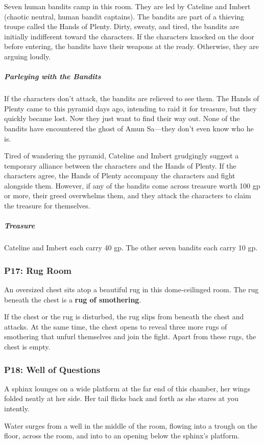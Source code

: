 \documentclass[10pt,a4paper,twoside,bg=print,twocolumn,openany,nodeprecatedcode]{dndbook}
\begin{document}
Seven human bandits camp in this room. They are led by Cateline and Imbert (chaotic neutral, human bandit captains). The bandits are part of a thieving troupe called the Hands of Plenty. Dirty, sweaty, and tired, the bandits are initially indifferent toward the characters. If the characters knocked on the door before entering, the bandits have their weapons at the ready. Otherwise, they are arguing loudly.

\subparagraph{Parleying with the Bandits}
If the characters don't attack, the bandits are relieved to see them. The Hands of Plenty came to this pyramid days ago, intending to raid it for treasure, but they quickly became lost. Now they just want to find their way out. None of the bandits have encountered the ghost of Amun Sa—they don't even know who he is.

Tired of wandering the pyramid, Cateline and Imbert grudgingly suggest a temporary alliance between the characters and the Hands of Plenty. If the characters agree, the Hands of Plenty accompany the characters and fight alongside them. However, if any of the bandits come across treasure worth 100 gp or more, their greed overwhelms them, and they attack the characters to claim the treasure for themselves.

\subparagraph{Treasure}
Cateline and Imbert each carry 40 gp. The other seven bandits each carry 10 gp.

\subsubsection{P17: Rug Room}
An oversized chest sits atop a beautiful rug in this dome-ceilinged room. The rug beneath the chest is a \textbf{rug of smothering}.

If the chest or the rug is disturbed, the rug slips from beneath the chest and attacks. At the same time, the chest opens to reveal three more rugs of smothering that unfurl themselves and join the fight. Apart from these rugs, the chest is empty.

\subsubsection{P18: Well of Questions}
\begin{DndReadAloud}{}
A sphinx lounges on a wide platform at the far end of this chamber, her wings folded neatly at her side. Her tail flicks back and forth as she stares at you intently.

Water surges from a well in the middle of the room, flowing into a trough on the floor, across the room, and into to an opening below the sphinx's platform.

\end{DndReadAloud}
\end{document}
